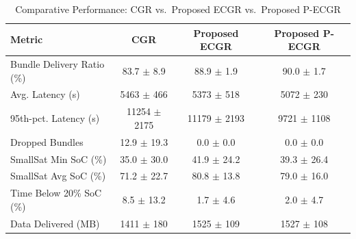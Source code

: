 \begin{table}[t]
\centering
\caption{Comparative Performance: CGR vs.\ Proposed ECGR vs.\ Proposed P-ECGR}
\label{tab:results}
\begin{tabular*}{\textwidth}{@{\extracolsep{\fill}}lccc}
\hline
\textbf{Metric} & \textbf{CGR} & \textbf{Proposed ECGR} & \textbf{Proposed P-ECGR} \\
\hline
Bundle Delivery Ratio (\%) & 83.7 $\pm$ 8.9 & 88.9 $\pm$ 1.9 & 90.0 $\pm$ 1.7 \\
Avg. Latency (s) & 5463 $\pm$ 466 & 5373 $\pm$ 518 & 5072 $\pm$ 230 \\
95th-pct. Latency (s) & 11254 $\pm$ 2175 & 11179 $\pm$ 2193 & 9721 $\pm$ 1108 \\
Dropped Bundles & 12.9 $\pm$ 19.3 & 0.0 $\pm$ 0.0 & 0.0 $\pm$ 0.0 \\
SmallSat Min SoC (\%) & 35.0 $\pm$ 30.0 & 41.9 $\pm$ 24.2 & 39.3 $\pm$ 26.4 \\
SmallSat Avg SoC (\%) & 71.2 $\pm$ 22.7 & 80.8 $\pm$ 13.8 & 79.0 $\pm$ 16.0 \\
Time Below 20\% SoC (\%) & 8.5 $\pm$ 13.2 & 1.7 $\pm$ 4.6 & 2.0 $\pm$ 4.7 \\
Data Delivered (MB) & 1411 $\pm$ 180 & 1525 $\pm$ 109 & 1527 $\pm$ 108 \\
\hline
\end{tabular*}
\end{table}
